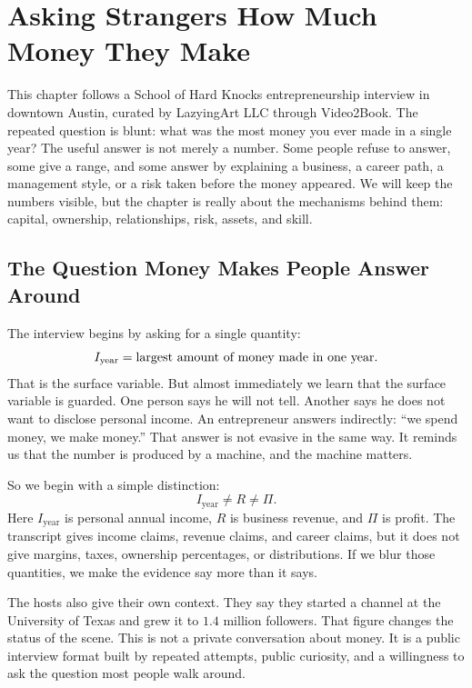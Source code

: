 \chapter{Asking Strangers How Much Money They Make}

This chapter follows a School of Hard Knocks entrepreneurship interview in downtown Austin, curated by LazyingArt LLC through Video2Book. The repeated question is blunt: what was the most money you ever made in a single year? The useful answer is not merely a number. Some people refuse to answer, some give a range, and some answer by explaining a business, a career path, a management style, or a risk taken before the money appeared. We will keep the numbers visible, but the chapter is really about the mechanisms behind them: capital, ownership, relationships, risk, assets, and skill.

\section{The Question Money Makes People Answer Around}

The interview begins by asking for a single quantity:
\begin{equation}
I_{\mathrm{year}}=\hbox{largest amount of money made in one year}.
\end{equation}
That is the surface variable. But almost immediately we learn that the surface variable is guarded. One person says he will not tell. Another says he does not want to disclose personal income. An entrepreneur answers indirectly: ``we spend money, we make money.'' That answer is not evasive in the same way. It reminds us that the number is produced by a machine, and the machine matters.

So we begin with a simple distinction:
\begin{equation}
I_{\mathrm{year}} \neq R \neq \Pi .
\end{equation}
Here \(I_{\mathrm{year}}\) is personal annual income, \(R\) is business revenue, and \(\Pi\) is profit. The transcript gives income claims, revenue claims, and career claims, but it does not give margins, taxes, ownership percentages, or distributions. If we blur those quantities, we make the evidence say more than it says.

The hosts also give their own context. They say they started a channel at the University of Texas and grew it to \(1.4\) million followers. That figure changes the status of the scene. This is not a private conversation about money. It is a public interview format built by repeated attempts, public curiosity, and a willingness to ask the question most people walk around.

